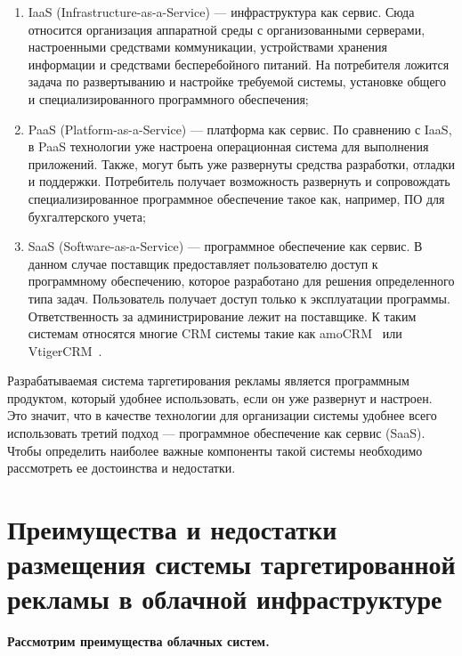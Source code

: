\begin{enumerate}
	\item IaaS (Infrastructure-as-a-Service) --- инфраструктура как сервис.
	Сюда относится организация аппаратной среды с организованными серверами, настроенными средствами коммуникации, устройствами хранения информации и средствами бесперебойного питаний. На потребителя ложится задача по развертыванию и настройке требуемой системы, установке общего и специализированного программного обеспечения;

	\item PaaS (Platform-as-a-Service) --- платформа как сервис.
	По сравнению с IaaS, в PaaS технологии уже настроена операционная система для выполнения приложений. Также, могут быть уже развернуты средства разработки, отладки и поддержки. Потребитель получает возможность развернуть и сопровождать специализированное программное обеспечение такое как, например, ПО для бухгалтерского учета;

	\item SaaS (Software-as-a-Service) --- программное обеспечение как сервис.
	В данном случае поставщик предоставляет пользователю доступ к программному обеспечению, которое разработано для решения определенного типа задач. Пользователь получает доступ только к эксплуатации программы. Ответственность за администрирование лежит на поставщике. К таким системам относятся многие CRM системы такие как amoCRM~\cite{amoCRMSite} или VtigerCRM~\cite{vtigerSite}.
\end{enumerate}

Разрабатываемая система таргетирования рекламы является программным продуктом, который удобнее использовать, если он уже развернут и настроен. Это значит, что в качестве технологии для организации системы удобнее всего использовать третий подход --- программное обеспечение как сервис (SaaS). Чтобы определить наиболее важные компоненты такой системы необходимо рассмотреть ее достоинства и недостатки. 

\section{Преимущества и недостатки размещения системы таргетированной рекламы в облачной инфраструктуре}

\textbf{Рассмотрим преимущества облачных систем.}

